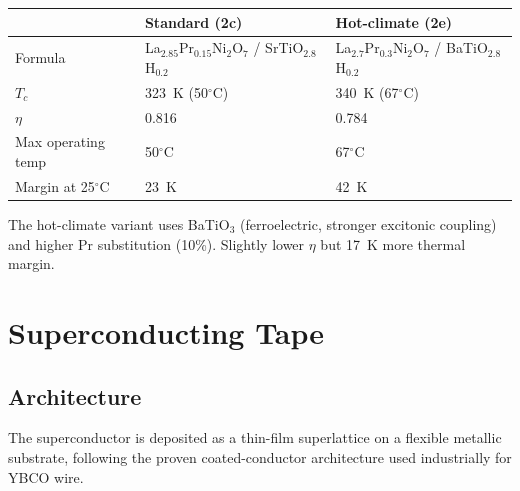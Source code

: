 \documentclass[11pt, a4paper]{article}
\begin{document}
\begin{center}
\begin{tabular}{@{}lll@{}}
\toprule
& \textbf{Standard (2c)} & \textbf{Hot-climate (2e)} \\
\midrule
Formula & La$_{2.85}$Pr$_{0.15}$Ni$_2$O$_7$ / SrTiO$_{2.8}$H$_{0.2}$
  & La$_{2.7}$Pr$_{0.3}$Ni$_2$O$_7$ / BaTiO$_{2.8}$H$_{0.2}$ \\
$T_c$ & 323~K (50$^\circ$C) & 340~K (67$^\circ$C) \\
$\eta$ & 0.816 & 0.784 \\
Max operating temp & 50$^\circ$C & 67$^\circ$C \\
Margin at 25$^\circ$C & 23~K & 42~K \\
\bottomrule
\end{tabular}
\end{center}

The hot-climate variant uses BaTiO$_3$ (ferroelectric, stronger
excitonic coupling) and higher Pr substitution (10\%). Slightly
lower $\eta$ but 17~K more thermal margin.

\section{Superconducting Tape}
\label{sec:tape}

\subsection{Architecture}

The superconductor is deposited as a thin-film superlattice on a
flexible metallic substrate, following the proven coated-conductor
architecture used industrially for YBCO wire.
\end{document}
